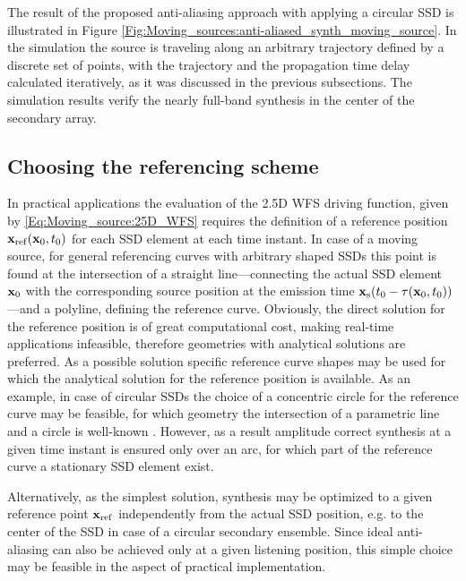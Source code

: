 The result of the proposed anti-aliasing approach with applying a circular SSD is illustrated in Figure \ref{Fig:Moving_sources:anti-aliased_synth_moving_source}.
In the simulation the source is traveling along an arbitrary trajectory defined by a discrete set of points, with the trajectory and the propagation time delay calculated iteratively, as it was discussed in the previous subsections.
The simulation results verify the nearly full-band synthesis in the center of the secondary array.

\subsection{Choosing the referencing scheme}
In practical applications the evaluation of the 2.5D WFS driving function, given by \eqref{Eq:Moving_source:25D_WFS} requires the definition of a reference position $\mathbf{x}_{\mathrm{ref}}(\mathbf{x}_0,t_0)$ for each SSD element at each time instant.
In case of a moving source, for general referencing curves with arbitrary shaped SSDs this point is found at the intersection of a straight line---connecting the actual SSD element $\mathbf{x}_0$ with the corresponding source position at the emission time $\mathbf{x}_{\mathrm{s}}(t_0-\tau(\mathbf{x}_0,t_0))$---and a polyline, defining the reference curve. 
Obviously, the direct solution for the reference position is of great computational cost, making real-time applications infeasible, therefore geometries with analytical solutions are preferred.
As a possible solution specific reference curve shapes may be used for which the analytical solution for the reference position is available.
As an example, in case of circular SSDs the choice of a concentric circle for the reference curve may be feasible, for which geometry the intersection of a parametric line and a circle is well-known \cite[Ch.7.3.2]{Schneider2003:ComputerGraphics}.
However, as a result amplitude correct synthesis at a given time instant is ensured only over an arc, for which part of the reference curve a stationary SSD element exist.

Alternatively, as the simplest solution, synthesis may be optimized to a given reference point $\mathbf{x}_{\mathrm{ref}}$ independently from the actual SSD position, e.g. to the center of the SSD in case of a circular secondary ensemble.
Since ideal anti-aliasing can also be achieved only at a given listening position, this simple choice may be feasible in the aspect of practical implementation.

